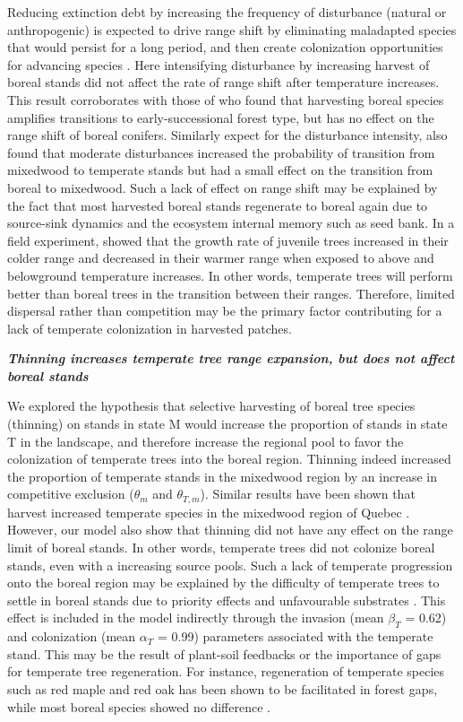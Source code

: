 Reducing extinction debt by increasing the frequency of disturbance
(natural or anthropogenic) is expected to drive range shift by
eliminating maladapted species that would persist for a long period, and
then create colonization opportunities for advancing species
\citep{Renwick2015, Kuparinen2010}. Here intensifying disturbance by
increasing harvest of boreal stands did not affect the rate of range
shift after temperature increases. This result corroborates with those
of \citet{Vanderwel2014} who found that harvesting boreal species
amplifies transitions to early-successional forest type, but has no
effect on the range shift of boreal conifers. Similarly expect for the
disturbance intensity, \citet{Brice2020} also found that moderate
disturbances increased the probability of transition from mixedwood to
temperate stands but had a small effect on the transition from boreal to
mixedwood. Such a lack of effect on range shift may be explained by the
fact that most harvested boreal stands regenerate to boreal again due to
source-sink dynamics and the ecosystem internal memory such as seed
bank. In a field experiment, \citet{Reich2015} showed that the growth
rate of juvenile trees increased in their colder range and decreased in
their warmer range when exposed to above and belowground temperature
increases. In other words, temperate trees will perform better than
boreal trees in the transition between their ranges. Therefore, limited
dispersal rather than competition may be the primary factor contributing
for a lack of temperate colonization in harvested patches.

\textbf{\emph{Thinning increases temperate tree range expansion, but
does not affect boreal stands}}

We explored the hypothesis that selective harvesting of boreal tree
species (thinning) on stands in state M would increase the proportion of
stands in state T in the landscape, and therefore increase the regional
pool to favor the colonization of temperate trees into the boreal
region. Thinning indeed increased the proportion of temperate stands in
the mixedwood region by an increase in competitive exclusion
(\(\theta_{m}\) and \(\theta_{T, m}\)). Similar results have been shown
that harvest increased temperate species in the mixedwood region of
Quebec \citep{Boulanger2019, Brice2020}. However, our model also show
that thinning did not have any effect on the range limit of boreal
stands. In other words, temperate trees did not colonize boreal stands,
even with a increasing source pools. Such a lack of temperate
progression onto the boreal region may be explained by the difficulty of
temperate trees to settle in boreal stands due to priority effects and
unfavourable substrates \citep{Solarik2018, Solarik2020}. This effect is
included in the model indirectly through the invasion (mean
\(\beta_{T}\) = 0.62) and colonization (mean \(\alpha_{T}\) = 0.99)
parameters associated with the temperate stand. This may be the result
of plant-soil feedbacks or the importance of gaps for temperate tree
regeneration. For instance, regeneration of temperate species such as
red maple and red oak has been shown to be facilitated in forest gaps,
while most boreal species showed no difference \citep{Leithead2010}.

